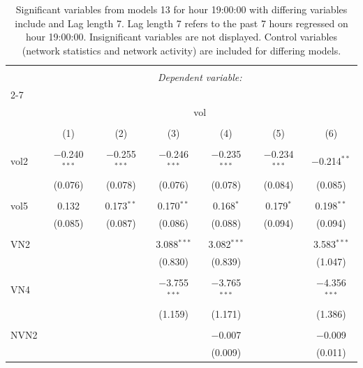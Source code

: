 
\begin{table}[!htbp] \centering 
  \caption{Significant variables from models 13 for hour 19:00:00 with differing variables include 
                               and Lag length 7. Lag length 7 refers to the past 7 hours regressed on hour 19:00:00. 
                               Insignificant variables are not displayed. 
                               Control variables (network statistics and network activity) are 
                               included for differing models.} 
  \label{Volumemodels1_t_hourlagged6} 
\scriptsize 
\begin{tabular}{@{\extracolsep{5pt}}lcccccc} 
\\[-1.8ex]\hline 
\hline \\[-1.8ex] 
 & \multicolumn{6}{c}{\textit{Dependent variable:}} \\ 
\cline{2-7} 
\\[-1.8ex] & \multicolumn{6}{c}{vol} \\ 
\\[-1.8ex] & (1) & (2) & (3) & (4) & (5) & (6)\\ 
\hline \\[-1.8ex] 
 vol2 & $-$0.240$^{***}$ & $-$0.255$^{***}$ & $-$0.246$^{***}$ & $-$0.235$^{***}$ & $-$0.234$^{***}$ & $-$0.214$^{**}$ \\ 
  & (0.076) & (0.078) & (0.076) & (0.078) & (0.084) & (0.085) \\ 
  & & & & & & \\ 
 vol5 & 0.132 & 0.173$^{**}$ & 0.170$^{**}$ & 0.168$^{*}$ & 0.179$^{*}$ & 0.198$^{**}$ \\ 
  & (0.085) & (0.087) & (0.086) & (0.088) & (0.094) & (0.094) \\ 
  & & & & & & \\ 
 VN2 &  &  & 3.088$^{***}$ & 3.082$^{***}$ &  & 3.583$^{***}$ \\ 
  &  &  & (0.830) & (0.839) &  & (1.047) \\ 
  & & & & & & \\ 
 VN4 &  &  & $-$3.755$^{***}$ & $-$3.765$^{***}$ &  & $-$4.356$^{***}$ \\ 
  &  &  & (1.159) & (1.171) &  & (1.386) \\ 
  & & & & & & \\ 
 NVN2 &  &  &  & $-$0.007 &  & $-$0.009 \\ 
  &  &  &  & (0.009) &  & (0.011) \\ 

\end{tabular}
\end{table}
